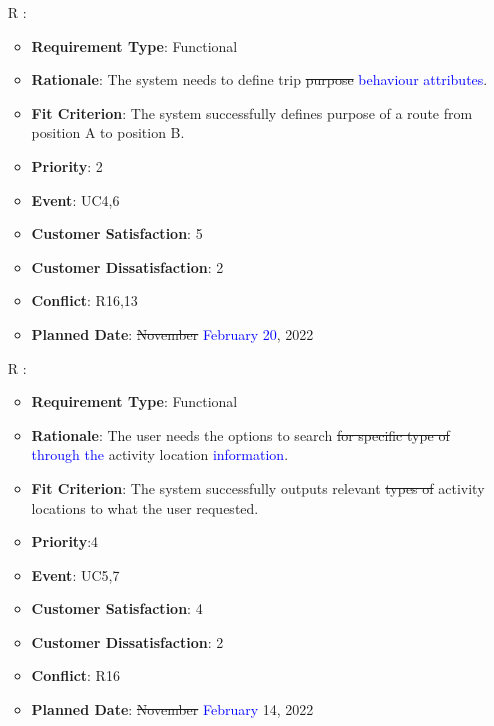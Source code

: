 \documentclass[12pt, titlepage]{article}
\newcounter{reqnum} %
\begin{document}
\begin{itemize}
\item[R\refstepcounter{reqnum}\thereqnum
\label{R_Inputs_1}:] 
\begin{itemize}
    \item \textbf{Requirement Type}: Functional
    \item \textbf{Rationale}: The system needs to define trip \sout{purpose} \textcolor{blue}{ behaviour attributes}. 
    \item \textbf{Fit Criterion}: The system successfully defines purpose of a route from position A to position B.
    \item \textbf{Priority}: 2
    \item \textbf{Event}: UC4,6
    \item \textbf{Customer Satisfaction}: 5
    \item \textbf{Customer Dissatisfaction}: 2
    \item \textbf{Conflict}: R16,13
    \item \textbf{Planned Date}: \sout{November} \textcolor{blue}{February 20}, 2022
\end{itemize}

\item[R\refstepcounter{reqnum}\thereqnum
\label{R_Inputs_1}:] 
\begin{itemize}
    \item \textbf{Requirement Type}: Functional
    \item \textbf{Rationale}: The user needs the options to search \sout{for specific type of} \textcolor{blue}{through the} activity location \textcolor{blue}{information}.
    \item \textbf{Fit Criterion}: The system successfully outputs relevant \sout{types of} activity locations to what the user requested. 
    \item \textbf{Priority}:4
    \item \textbf{Event}: UC5,7
    \item \textbf{Customer Satisfaction}: 4
    \item \textbf{Customer Dissatisfaction}: 2
    \item \textbf{Conflict}: R16
    \item \textbf{Planned Date}: \sout{November} \textcolor{blue}{February} 14, 2022
\end{itemize}


\end{itemize}
\end{document}
